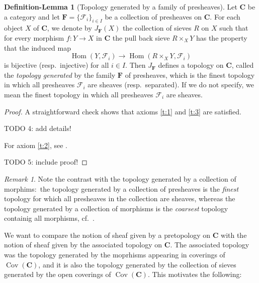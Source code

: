 \documentclass[12pt,reqno,a4paper]{amsart}
\theoremstyle{plain}
\theoremstyle{definition}
\newtheorem{defnlm}[thm]{Definition-Lemma}
\theoremstyle{remark}
\newtheorem{rem}[thm]{Remark}
\begin{document}
\begin{defnlm}[Topology generated by a family of presheaves]\label{defnlm:generatedtopology}
  Let $\mathbf{C}$ be a category and let $\mathbf{F} = \{ \mathscr{F}_{i} \}_{i \in I}$ be a collection of presheaves on $\mathbf{C}$.
  For each object $X$ of $\mathbf{C}$, we denote by $J_{\mathbf{F}}(X)$ the collection of sieves $R$ on $X$ such that for every morphism $f \colon Y \to X$ in $\mathbf{C}$ the pull back sieve $R \times_{X} Y$ has the property that the induced map
  \[ \operatorname{Hom}(Y,\mathscr{F}_{i}) \to \operatorname{Hom}(R \times_{X} Y, \mathscr{F}_{i}) \]
  is bijective (resp.~injective) for all $i \in I$.
  Then $J_{\mathbf{F}}$ defines a topology on $\mathbf{C}$, called the \textit{topology generated} by the family $\mathbf{F}$ of presheaves, which is the finest topology in which all presheaves $\mathscr{F}_{i}$ are sheaves (resp.~separated).
  If we do not specify, we mean the finest topology in which all presheaves $\mathscr{F}_{i}$ are sheaves.
  \begin{proof}
    A straightforward check shows that axioms \ref{t:1} and \ref{t:3} are satisfied.

    {\color{red} TODO 4: add details!}

    For axiom \ref{t:2}, see \cite[Exposé II, Proposition 2.2]{sga4}.

    {\color{red} TODO 5: include proof!}
  \end{proof}
\end{defnlm}

\begin{rem}
  Note the contrast with the topology generated by a collection of morphims:~the topology generated by a collection of presheaves is the \textit{finest} topology for which all presheaves in the collection are sheaves, whereas the topology generated by a collection of morphisms is the \textit{coarsest} topology containig all morphisms, cf.~.
\end{rem}

We want to compare the notion of sheaf given by a pretopology on $\mathbf{C}$ with the notion of sheaf given by the associated topology on $\mathbf{C}$.
The associated topology was the topology generated by the moprhisms appearing in coverings of $\operatorname{Cov}(\mathbf{C})$, and it is also the topology generated by the collection of sieves generated by the open coverings of $\operatorname{Cov}(\mathbf{C})$.
This motivates the following:
\end{document}
